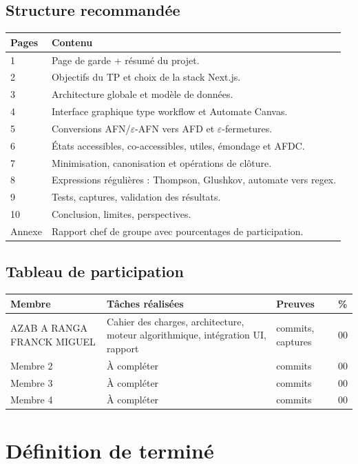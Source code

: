 \documentclass[11pt,a4paper]{report}
\newcommand{\eps}{\ensuremath{\varepsilon}}
\begin{document}
\section{Structure recommandée}
\begin{longtable}{p{}p{}}
\toprule
\textbf{Pages} & \textbf{Contenu}\\
\midrule
1 & Page de garde + résumé du projet.\\
2 & Objectifs du TP et choix de la stack Next.js.\\
3 & Architecture globale et modèle de données.\\
4 & Interface graphique type workflow et Automate Canvas.\\
5 & Conversions AFN/\eps-AFN vers AFD et \eps-fermetures.\\
6 & États accessibles, co-accessibles, utiles, émondage et AFDC.\\
7 & Minimisation, canonisation et opérations de clôture.\\
8 & Expressions régulières : Thompson, Glushkov, automate vers regex.\\
9 & Tests, captures, validation des résultats.\\
10 & Conclusion, limites, perspectives.\\
Annexe & Rapport chef de groupe avec pourcentages de participation.\\
\bottomrule
\end{longtable}

\section{Tableau de participation}
\begin{longtable}{p{}p{}p{}p{}}
\toprule
\textbf{Membre} & \textbf{Tâches réalisées} & \textbf{Preuves} & \textbf{\%}\\
\midrule
AZAB A RANGA FRANCK MIGUEL & Cahier des charges, architecture, moteur algorithmique, intégration UI, rapport & commits, captures & 00\\
Membre 2 & À compléter & commits & 00\\
Membre 3 & À compléter & commits & 00\\
Membre 4 & À compléter & commits & 00\\
\bottomrule
\end{longtable}

\chapter{Définition de terminé}
\end{document}
